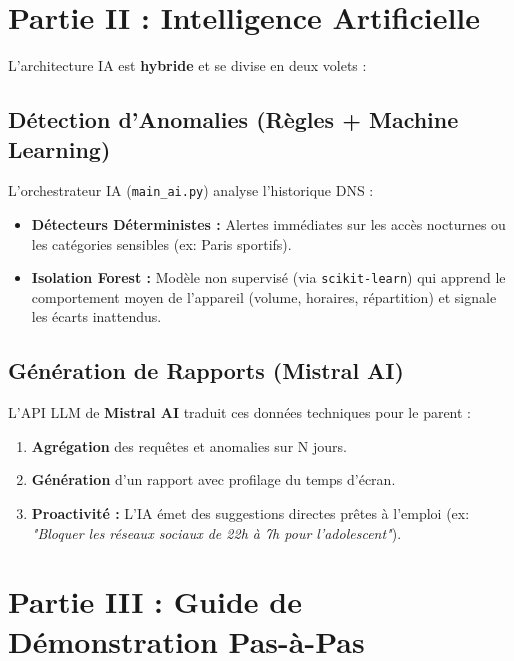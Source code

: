 \documentclass[11pt,a4paper]{article}
\begin{document}
\section{Partie II : Intelligence Artificielle}

L'architecture IA est \textbf{hybride} et se divise en deux volets :

\subsection{Détection d'Anomalies (Règles + Machine Learning)}
L'orchestrateur IA (\texttt{main\_ai.py}) analyse l'historique DNS :
\begin{itemize}
    \item \textbf{Détecteurs Déterministes :} Alertes immédiates sur les accès nocturnes ou les catégories sensibles (ex: Paris sportifs).
    \item \textbf{Isolation Forest :} Modèle non supervisé (via \texttt{scikit-learn}) qui apprend le comportement moyen de l'appareil (volume, horaires, répartition) et signale les écarts inattendus.
\end{itemize}

\subsection{Génération de Rapports (Mistral AI)}
L'API LLM de \textbf{Mistral AI} traduit ces données techniques pour le parent :
\begin{enumerate}
    \item \textbf{Agrégation} des requêtes et anomalies sur N jours.
    \item \textbf{Génération} d'un rapport avec profilage du temps d'écran.
    \item \textbf{Proactivité :} L'IA émet des suggestions directes prêtes à l'emploi (ex: \textit{"Bloquer les réseaux sociaux de 22h à 7h pour l'adolescent"}).
\end{enumerate}

\newpage

\section{Partie III : Guide de Démonstration Pas-à-Pas}
\end{document}
